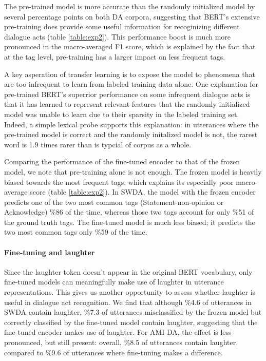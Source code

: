 \documentclass[11pt,a4paper]{article}
\begin{document}
The pre-trained model is more accurate than the randomly initialized model by several percentage points on both DA corpora,
suggesting that BERT's extensive pre-training does provide some useful information for recoginizing different dialogue acts (table \ref{table:exp2}).
This performance boost is much more pronounced in the macro-averaged F1 score,
which is explained by the fact that at the tag level, pre-training has a larger impact on less frequent tags. 

A key asperation of transfer learning is to expose the model to phenomena that are too infrequent to learn from labeled training data alone.
One explanation for pre-trained BERT's superrior performance on some infrequent dialogue acts is that it has learned to represent relevant features
that the randomly initialized model was unable to learn due to their sparsity in the labeled training set.
Indeed, a simple lexical probe supports this explanation: in utterances where the pre-trained model is correct and the randomly initalized model is not,
the rarest word is 1.9 times rarer than is typcial of corpus as a whole.

Comparing the performance of the fine-tuned encoder to that of the frozen model, we note that pre-training alone is not enough.
The frozen model is heavily biased towards the most frequent tags, which explains its especially poor macro-average score (table \ref{table:exp2}).
In SWDA, the model with the frozen encoder predicts one of the two most common tags (Statement-non-opinion or Acknowledge) \%86 of the time, whereas those two
tags account for only \%51 of the ground truth tags.
The fine-tuned model is much less biased; it predicts the two most common tags only \%59 of the time.




\paragraph{Fine-tuning and laughter}
Since the laughter token doesn't appear in the original BERT vocabulary, only fine-tuned models can meaningfully make use of laughter in utterance representations. 
This gives us another opportunity to assess whether laughter is useful in dialogue act recognition.
We find that although \%4.6 of utterances in SWDA contain laughter, 
\%7.3 of utterances misclassified by the frozen model but correctly classified by the fine-tuned model contain laughter, 
suggesting that the fine-tuned encoder makes use of laughter. 
For AMI-DA, the effect is less pronounced, but still present: 
overall, \%8.5 of utterances contain laughter, 
compared to \%9.6 of utterances where fine-tuning makes a difference. 
\end{document}
